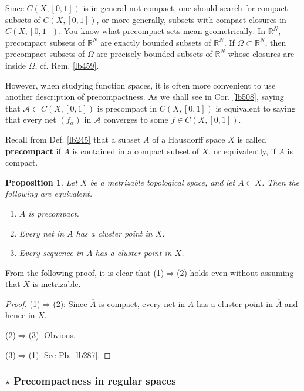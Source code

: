 \documentclass[12pt,b5paper,notitlepage]{article}
\theoremstyle{definition}
\theoremstyle{plain}
\newtheorem{pp}[df]{Proposition}
\newcommand{\ovl}{\overline}
\newcommand{\scr}{\mathscr}
\newcommand{\Rbb}{\mathbb R}
\numberwithin{equation}{section}
\begin{document}
Since $C(X,[0,1])$ is in general not compact, one should search for compact subsets of $C(X,[0,1])$, or more generally, subsets with compact closures in $C(X,[0,1])$. You know what precompact sets mean geometrically: In $\Rbb^N$, precompact subsets of $\Rbb^N$ are exactly bounded subsets of $\Rbb^N$. If $\Omega\subset\Rbb^N$, then precompact subsets of $\Omega$ are precisely bounded subsets of $\Rbb^N$ whose closures are inside $\Omega$, cf. Rem. \ref{lb459}. 

However, when studying function spaces, it is often more convenient to use another description of precompactness. As we shall see in Cor. \ref{lb508}, saying that $\scr A\subset C(X,[0,1])$ is precompact in $C(X,[0,1])$ is equivalent to saying that every net $(f_\alpha)$ in $\scr A$ converges to some $f\in C(X,[0,1])$.






Recall from Def. \ref{lb245} that a subset $A$ of a Hausdorff space $X$ is called \textbf{precompact} if $A$ is contained in a compact subset of $X$, or equivalently, if $\ovl A$ is compact. %


\begin{pp}\label{lb505}
Let $X$ be a metrizable topological space, and let $A\subset X$. Then the following are equivalent.
\begin{enumerate}[label=(\arabic*)]
\item $A$ is precompact.
\item Every net in $A$ has a cluster point in $X$.
\item Every sequence in $A$ has a cluster point in $X$.
\end{enumerate}
\end{pp}

From the following proof, it is clear that (1)$\Rightarrow$(2) holds even without assuming that $X$ is metrizable.

\begin{proof}
(1)$\Rightarrow$(2): Since $\ovl A$ is compact, every net in $A$ has a cluster point in $\ovl A$ and hence in $X$. 

(2)$\Rightarrow$(3): Obvious.

(3)$\Rightarrow$(1): See Pb. \ref{lb287}.
\end{proof}



\subsubsection{$\star$ Precompactness in regular spaces}
\end{document}
